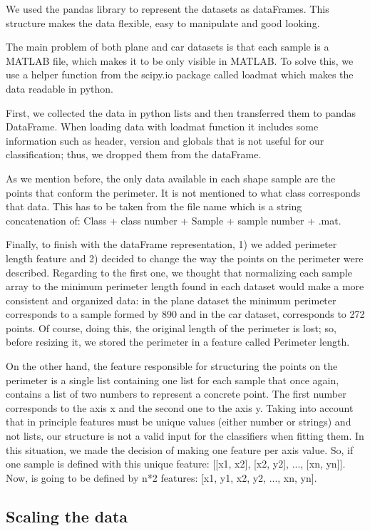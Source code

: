 \documentclass{article} %
\begin{document}
We used the pandas library to represent the datasets as dataFrames. This structure makes the data flexible, easy to manipulate and good looking. 

The main problem of both plane and car datasets is that each sample is a MATLAB file, which makes it to be only visible in MATLAB. To solve this, we use a helper function from the scipy.io package called loadmat which makes the data readable in python. 

First, we collected the data in python lists and then transferred them to pandas DataFrame. When loading data with loadmat function it includes some information such as header, version and globals that is not useful for our classification; thus, we dropped them from the dataFrame. 

As we mention before, the only data available in each shape sample are the points that conform the perimeter. It is not mentioned to what class corresponds that data. This has to be taken from the file name which is a string concatenation of: Class + class number + Sample + sample number + .mat. 

Finally, to finish with the dataFrame representation, 1) we added perimeter length feature and 2) decided to change the way the points on the perimeter were described. Regarding to the first one, we thought that normalizing each sample array to the minimum perimeter length found in each dataset would make a more consistent and organized data: in the plane dataset the minimum perimeter corresponds to a sample formed by 890 and in the car dataset, corresponds to 272 points. Of course, doing this, the original length of the perimeter is lost; so, before resizing it, we stored the perimeter in a feature called Perimeter length.

On the other hand, the feature responsible for structuring the points on the perimeter is a single list containing one list for each sample that once again, contains a list of two numbers to represent a concrete point. The first number corresponds to the axis x and the second one to the axis y. Taking into account that in principle features must be unique values (either number or strings) and not lists, our structure is not a valid input for the classifiers when fitting them. In this situation, we made the decision of making one feature per axis value. So, if one sample is defined with this unique feature: [[x1, x2], [x2, y2], ..., [xn, yn]]. Now, is going to be defined by n*2 features: [x1, y1, x2, y2, ..., xn, yn].

\subsection{Scaling the data}
 
\end{document}
